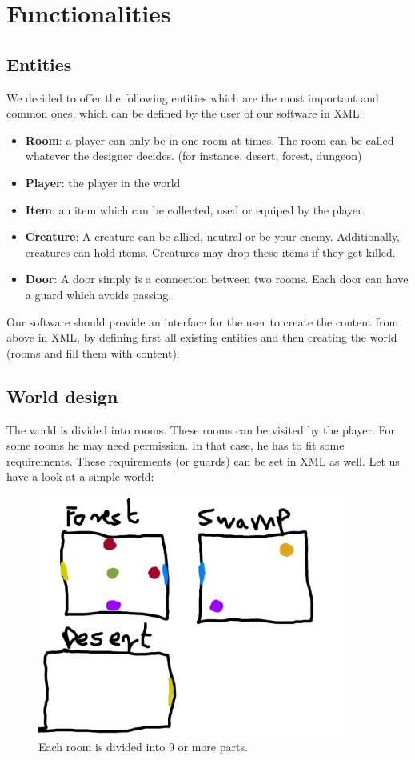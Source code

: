 \chapter{Functionalities}
\section{Entities}
We decided to offer the following entities which are the most important and common ones, which can be defined by the user of our software in XML:

\begin{itemize}
	\item{\textbf{Room}: a player can only be in one room at times. The room can be called whatever the designer decides. (for instance, desert, forest, dungeon)}
	\item{\textbf{Player}: the player in the world}
	\item{\textbf{Item}: an item which can be collected, used or equiped by the player.}
	\item{\textbf{Creature}: A creature can be allied, neutral or be your enemy. Additionally, creatures can hold items. Creatures may drop these items if they get killed.}
	\item{\textbf{Door}: A door simply is a connection between two rooms. Each door can have a guard which avoids passing.}
\end{itemize}

Our software should provide an interface for the user to create the content from above in XML, by defining first all existing entities and then creating the world (rooms and fill them with content).

\section{World design}

The world is divided into rooms. These rooms can be visited by the player. For some rooms he may need permission. In that case, he has to fit some requirements. These requirements (or guards) can be set in XML as well. Let us have a look at a simple world:

\begin{figure}[hb]
  \centering
  \includegraphics[width=4in]{../demo/demo.jpg}
  \caption{Each room is divided into 9 or more parts.}
\end{figure}

